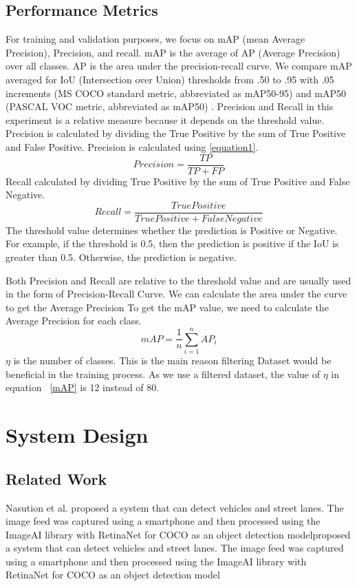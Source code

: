 \documentclass[conference]{IEEEtran}
\begin{document}
\subsection{Performance Metrics}
For training and validation purposes, we focus on mAP (mean Average Precision), Precision, and recall. mAP is the average of AP (Average Precision) over all classes. AP is the area under the precision-recall curve.
We compare mAP averaged for IoU (Intersection over Union) thresholds from .50 to .95 with .05 increments (MS COCO standard metric, abbreviated as mAP50-95) and mAP50 (PASCAL VOC metric, abbreviated as mAP50) \cite{COCO Dataset}. 
Precision and Recall in  this experiment is a relative measure because it depends on the threshold value.
Precision is calculated by dividing the True Positive by the sum of True Positive and False Positive. 
Precision is calculated using \eqref{equation1}.
\begin{equation}
Precision = \frac{TP}{TP+FP}
\label{equation1}
\end{equation}
Recall calculated by dividing True Positive by the sum of True Positive and False Negative.
\begin{equation}
Recall = \frac{True Positive}{TruePositive+FalseNegative}
\end{equation}
The threshold value determines whether the prediction is Positive or Negative. For example, if the threshold is 0.5, then the prediction is positive if the IoU is greater than 0.5. Otherwise, the prediction is negative.

Both Precision and Recall are relative to the threshold value and are usually used in the form of Precision-Recall Curve. We can calculate the area under the curve to get the Average Precision
To get the mAP value, we need to calculate the Average Precision for each class.
\begin{equation}
mAP = \frac{1}{n}\sum_{i=1}^{n}AP_i
\label{mAP}
\end{equation}
$\eta$ is the number of classes.
This is the main reason filtering Dataset would be beneficial in the training process. As we use a filtered dataset, the value of $\eta$ in equation ~\ref{mAP} is 12 instead of 80.


\section{System Design}
\subsection{Related Work}
Nasution et al.\cite{Road Information Collector} proposed a system that can detect vehicles and street lanes. The image feed was captured using a smartphone and then processed using the ImageAI library with RetinaNet for COCO as an object detection modelproposed a system that can detect vehicles and street lanes. The image feed was captured using a smartphone and then processed using the ImageAI library with RetinaNet for COCO as an object detection model
\end{document}
